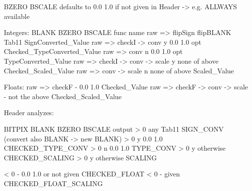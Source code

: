 

BZERO BSCALE defaults to 0.0 1.0 if not given in Header -> e.g. ALLWAYS available
				
Integers:			BLANK	BZERO BSCALE		func name
raw => flipSign		     flipBLANK	Tab11			SignConverted_Value
raw => checkI -> conv		  y	0.0 1.0  		opt Checked_TypeConverted_Value
raw => conv		  	  n	0.0 1.0  		opt TypeConverted_Value
raw => checkI -> conv -> scale	  y 	none of above		Checked_Scaled_Value
raw => conv -> scale		  n	none of above		Scaled_Value


Floats:
raw => checkF			  -	0.0 1.0			Checked_Value
raw => checkF -> conv -> scale	  -	not the above		Checked_Scaled_Value



Header analyzes:

BITPIX		BLANK	BZERO BSCALE		output
 > 0		 any	Tab11			SIGN_CONV (convert also BLANK -> new BLANK)
 > 0		  y	0.0 1.0			CHECKED_TYPE_CONV
 > 0		  n	0.0 1.0 		TYPE_CONV
 > 0		  y	otherwise		CHECKED_SCALING
 > 0		  y	otherwise		SCALING

 < 0		  -	0.0 1.0 or not given	CHECKED_FLOAT	
 < 0		  -	given			CHECKED_FLOAT_SCALING	

